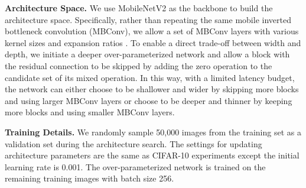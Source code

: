 \documentclass{article} \usepackage{iclr2019_conference,times}
\newcommand{\minisection}[1]{\vspace{5pt}\noindent\textbf{#1.}}
\begin{document}
\minisection{Architecture Space} We use MobileNetV2 \citep{sandler2018mobilenetv2} as the backbone to build the architecture space. Specifically, rather than repeating the same mobile inverted bottleneck convolution (MBConv), we allow a set of MBConv layers with various kernel sizes  and expansion ratios . To enable a direct trade-off between width and depth, we initiate a deeper over-parameterized network and allow a block with the residual connection to be skipped by adding the zero operation to the candidate set of its mixed operation. In this way, with a limited latency budget, the network can either choose to be shallower and wider by skipping more blocks and using larger MBConv layers or choose to be deeper and thinner by keeping more blocks and using smaller MBConv layers.

\minisection{Training Details} We randomly sample 50,000 images from the training set as a validation set during the architecture search. The settings for updating architecture parameters are the same as CIFAR-10 experiments except the initial learning rate is 0.001. The over-parameterized network is trained on the remaining training images with batch size 256. 
\end{document}
